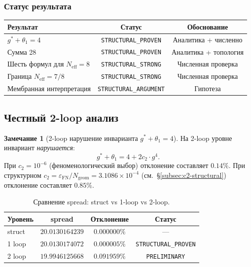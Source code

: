 \documentclass[11pt,a4paper]{article}
\newcommand{\epsFN}{\ensuremath{\varepsilon_{\text{FN}}}}
\theoremstyle{definition}
\newtheorem{remark}[theorem]{Замечание}
\begin{document}
\subsubsection{Статус результата}

\begin{center}
\begin{tabular}{lcc}
\toprule
Результат & Статус & Обоснование \\
\midrule
$g^* + \theta_1 = 4$ & \texttt{STRUCTURAL\_PROVEN} &
Аналитика + численно \\
Сумма 28 & \texttt{STRUCTURAL\_PROVEN} &
Аналитика + топология \\
Шесть формул для $N_{\text{eff}} = 8$ & \texttt{STRUCTURAL\_STRONG} &
Численная проверка \\
Граница $N_{\text{eff}} = 7/8$ & \texttt{STRUCTURAL\_STRONG} &
Численная проверка \\
Мембранная интерпретация & \texttt{STRUCTURAL\_ARGUMENT} &
Гипотеза \\
\bottomrule
\end{tabular}
\end{center}

\subsection{Честный 2-loop анализ}
\label{subsec:frg-2loop}

\begin{remark}[2-loop нарушение инварианта $g^* + \theta_1 = 4$]
\label{rem:2loop-broken}
На 2-loop уровне инвариант \emph{нарушается}:
\begin{equation}
    g^* + \theta_1 = 4 + 2c_2 \cdot g^4.
    \label{eq:2loop-invariant}
\end{equation}
При $c_2 = 10^{-6}$ (феноменологический выбор) отклонение
составляет $0.14\%$. При структурном $c_2 = \epsFN/N_{\text{geom}}
= 3.1086 \times 10^{-4}$ (см.~\S\ref{subsec:c2-structural})
отклонение составляет $0.85\%$.
\end{remark}

\begin{table}[ht]
\centering
\caption{Сравнение spread: struct vs 1-loop vs 2-loop.}
\label{tab:spread-2loop}
\begin{tabular}{lccc}
\toprule
Уровень & spread & Отклонение & Статус \\
\midrule
struct & $20.0130164239$ & $0.000000\%$ & --- \\
1 loop & $20.0130174072$ & $\mathbf{0.000005\%}$ & \texttt{STRUCTURAL\_PROVEN} \\
2 loop & $19.9946125668$ & $0.091959\%$ & \texttt{PRELIMINARY} \\
\bottomrule
\end{tabular}
\end{table}
\end{document}
